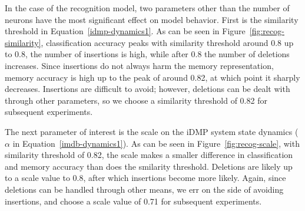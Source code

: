 
In the case of the recognition model,
two parameters other than the number of neurons
have the most significant effect on model behavior.
First is the similarity threshold
in Equation~\eqref{idmp-dynamics1}.
As can be seen in Figure~\ref{fig:recog-similarity},
classification accuracy peaks with
similarity threshold around 0.8
up to 0.8, the number of insertions
is high, while after 0.8
the number of deletions increases.
Since insertions do not always harm
the memory representation,
memory accuracy is high
up to the peak of around 0.82,
at which point it sharply decreases.
Insertions are difficult to avoid;
however, deletions can be dealt
with through other parameters,
so we choose a similarity threshold of
0.82 for subsequent experiments.


The next parameter of interest is the
scale on the iDMP system state dynamics
($\alpha$ in Equation~\eqref{imdb-dynamics1}).
As can be seen in Figure~\ref{fig:recog-scale},
with similarity threshold of 0.82,
the scale makes a smaller difference
in classification and memory accuracy
than does the smilarity threshold.
Deletions are likely up to
a scale value to 0.8,
after which insertions become more likely.
Again, since deletions can be handled
through other means,
we err on the side of avoiding insertions,
and choose a scale value of 0.71
for subsequent experiments.

